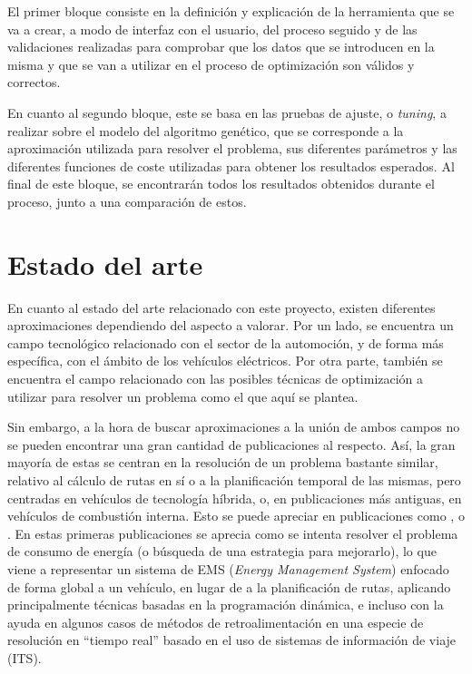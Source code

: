 \documentclass[11pt,spanish,listoffigures,listoftables]{tfgetsinf}
\begin{document}
El primer bloque consiste en la definición y explicación de la herramienta que se va a crear, a modo de interfaz con el usuario, del proceso seguido y de las validaciones realizadas para comprobar que los datos que se introducen en la misma y que se van a utilizar en el proceso de optimización son válidos y correctos.

En cuanto al segundo bloque, este se basa en las pruebas de ajuste, o \textit{tuning}, a realizar sobre el modelo del algoritmo genético, que se corresponde a la aproximación utilizada para resolver el problema, sus diferentes parámetros y las diferentes funciones de coste utilizadas para obtener los resultados esperados. Al final de este bloque, se encontrarán todos los resultados obtenidos durante el proceso, junto a una comparación de estos.

\chapter{Estado del arte}
En cuanto al estado del arte relacionado con este proyecto, existen diferentes aproximaciones dependiendo del aspecto a valorar. Por un lado, se encuentra un campo tecnológico relacionado con el sector de la automoción, y de forma más específica, con el ámbito de los vehículos eléctricos. Por otra parte, también se encuentra el campo relacionado con las posibles técnicas de optimización a utilizar para resolver un problema como el que aquí se plantea. %

Sin embargo, a la hora de buscar aproximaciones a la unión de ambos campos no se pueden encontrar una gran cantidad de publicaciones al respecto. Así, la gran mayoría de estas se centran en la resolución de un problema bastante similar, relativo al cálculo de rutas en sí o a la planificación temporal de las mismas, pero centradas en vehículos de tecnología híbrida, o, en publicaciones más antiguas, en vehículos de combustión interna. Esto se puede apreciar en publicaciones como \cite{Bader13}, \cite{KJSS10} o \cite{EVS26}. En estas primeras publicaciones se aprecia como se intenta resolver el problema de consumo de energía (o búsqueda de una estrategia para mejorarlo), lo que viene a representar un sistema de EMS (\textit{Energy Management System}) enfocado de forma global a un vehículo, en lugar de a la planificación de rutas, aplicando principalmente técnicas basadas en la programación dinámica, e incluso con la ayuda en algunos casos de métodos de retroalimentación en una especie de resolución en ``tiempo real'' basado en el uso de sistemas de información de viaje (ITS).
\end{document}
